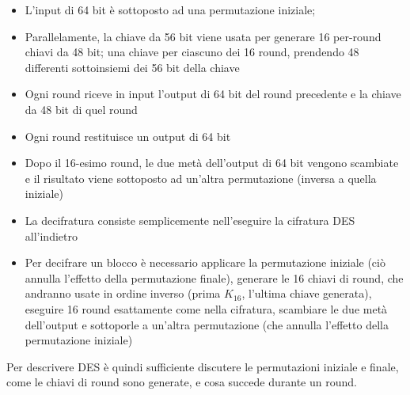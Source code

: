 \begin{itemize}
  \item L'input di 64 bit è sottoposto ad una permutazione iniziale;
  \item Parallelamente, la chiave da 56 bit viene usata per generare 16 per-round chiavi da 48 bit; una chiave per ciascuno dei 16 round, prendendo 48 differenti sottoinsiemi dei 56 bit della chiave
  \item Ogni round riceve in input l'output di 64 bit del round precedente e la chiave da 48 bit di quel round
  \item Ogni round restituisce un output di 64 bit
  \item Dopo il 16-esimo round, le due metà dell'output di 64 bit vengono scambiate e il risultato viene sottoposto ad un'altra permutazione (inversa a quella iniziale)
  \item La decifratura consiste semplicemente nell'eseguire la cifratura DES all'indietro
  \item Per decifrare un blocco è necessario applicare la permutazione iniziale (ciò annulla l'effetto della permutazione finale), generare le 16 chiavi di round, che andranno usate in ordine inverso (prima $K_{16}$, l'ultima chiave generata), eseguire 16 round esattamente come nella cifratura, scambiare le due metà dell'output e sottoporle a un'altra permutazione (che annulla l'effetto della permutazione iniziale)
\end{itemize}
Per descrivere DES è quindi sufficiente discutere le permutazioni iniziale e finale, come le chiavi di round sono generate, e cosa succede durante un round.


